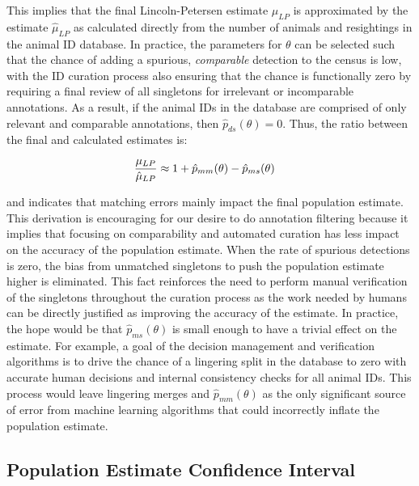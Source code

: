 \noindent This implies that the final Lincoln-Petersen estimate $\mu_{LP}$ is approximated by the estimate $\hat{\mu}_{LP}$ as calculated directly from the number of animals and resightings in the animal ID database.  In practice, the parameters for $\theta$ can be selected such that the chance of adding a spurious, {\it comparable} detection to the census is low, with the ID curation process also ensuring that the chance is functionally zero by requiring a final review of all singletons for irrelevant or incomparable annotations.  As a result, if the animal IDs in the database are comprised of only relevant and comparable annotations, then $\hat{p}_{ds}(\theta) = 0$. Thus, the ratio between the final and calculated estimates is:

\begin{align}
    \begin{split}
        \frac{\displaystyle \mu_{LP}}{\displaystyle \hat{\mu}_{LP}} &\approx 1 + \hat{p}_{mm}(\theta) - \hat{p}_{ms}(\theta)
    \end{split}
\end{align}

\noindent and indicates that matching errors mainly impact the final population estimate.  This derivation is encouraging for our desire to do annotation filtering because it implies that focusing on comparability and automated curation has less impact on the accuracy of the population estimate.  When the rate of spurious detections is zero, the bias from unmatched singletons to push the population estimate higher is eliminated.  This fact reinforces the need to perform manual verification of the singletons throughout the curation process as the work needed by humans can be directly justified as improving the accuracy of the estimate.  In practice, the hope would be that $\hat{p}_{ms}(\theta)$ is small enough to have a trivial effect on the estimate.  For example, a goal of the decision management and verification algorithms is to drive the chance of a lingering split in the database to zero with accurate human decisions and internal consistency checks for all animal IDs.  This process would leave lingering merges and $\hat{p}_{mm}(\theta)$ as the only significant source of error from machine learning algorithms that could incorrectly inflate the population estimate.

\subsection{Population Estimate Confidence Interval}

